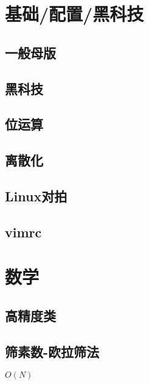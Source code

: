 \documentclass[10pt]{article}
\begin{document}
\tableofcontents
\newpage
\section{基础/配置/黑科技}
\subsection{一般母版}


\subsection{黑科技}


\subsection{位运算}


\subsection{离散化}


\subsection{Linux对拍}


\subsection{vimrc}

\section{数学}
\subsection{高精度类}


\subsection{筛素数-欧拉筛法}
$O(N)$

\end{document}
